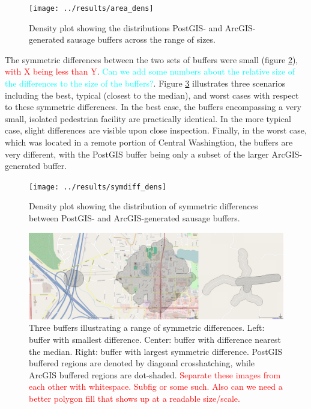 \documentclass[11pt,letterpaper]{article} %
\begin{document}
\begin{figure}[h!]
  \centering
  \texttt{[image: ../results/area\_dens]}
  \caption{Density plot showing the distributions PostGIS- and
    ArcGIS-generated sausage buffers across the range of sizes.}
  \label{fig:area_dens}
\end{figure}

The symmetric differences between the two sets of
buffers were small (figure \ref{fig:symdiff_dens}), \textcolor{red}{with X being less than Y}. \textcolor{cyan}{Can we add some numbers about the relative size of the differences to the size of the buffers?}. Figure \ref{fig:symmetric_differences} illustrates
three scenarios including the best, typical (closest to the median),
and worst cases with respect to these symmetric differences. In the
best case, the buffers encompassing a very small, isolated
pedestrian facility are practically identical. In the more typical
case, slight differences are visible upon close inspection. Finally,
in the worst case, which was located in a remote portion of Central
Washingtion, the buffers are very different, with
the PostGIS buffer being only a subset of the larger ArcGIS-generated buffer.

\begin{figure}[h!]
  \centering
  \texttt{[image: ../results/symdiff\_dens]}
  \caption{Density plot showing the distribution of symmetric
    differences between PostGIS- and ArcGIS-generated sausage buffers.}
  \label{fig:symdiff_dens}
\end{figure}

\begin{figure}[h!]
  \centering
  \includegraphics[width=\textwidth]{./figs/symmetric-differences}
  \caption{Three buffers illustrating a range of symmetric
    differences. Left: buffer with smallest difference. Center:
    buffer with difference nearest the median. Right: buffer with largest
    symmetric difference. PostGIS buffered regions are denoted by
    diagonal crosshatching, while ArcGIS buffered regions are
    dot-shaded. \textcolor{red}{Separate these images from each other with whitespace. Subfig or some such. Also can we need a better polygon fill that shows up at a readable size/scale.}}
  \label{fig:symmetric_differences}
\end{figure}
\end{document}
